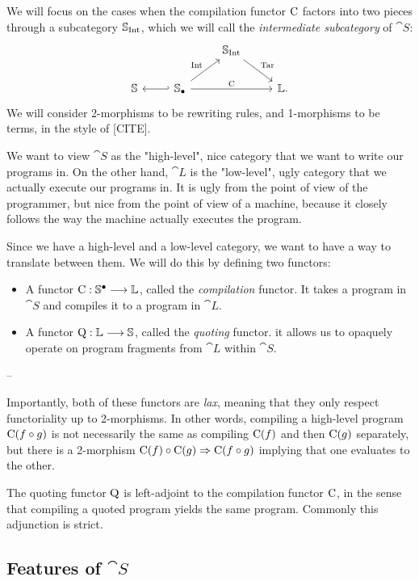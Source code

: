 We will focus on the cases when the compilation functor $\mathrm C$ factors into
two pieces through a subcategory $\mathbb S _{\mathrm{Int}}$, which we will call the
\emph{intermediate subcategory} of $\cat S$: $$
  \begin{tikzcd}
    & & \cat S_{\fun{Int}} \arrow[dr, "\fun{Tar}"] & \\
    \cat S & \arrow[l, hook'] \cat S_{\bullet} \arrow[ur, "\fun{Int}"] \arrow[rr, "\fun{C}"] & & \cat L .
  \end{tikzcd}
$$
We will consider 2-morphisms to be rewriting rules, and 1-morphisms to be
terms, in the style of [CITE].

We want to view $\cat S$ as the "high-level", nice category that we want to
write our programs in. On the other hand, $\cat L$ is the "low-level", ugly
category that we actually execute our programs in. It is ugly from the point of
view of the programmer, but nice from the point of view of a machine, because
it closely follows the way the machine actually executes the program.

Since we have a high-level and a low-level category, we want to have a way to
translate between them. We will do this by defining two functors:
\begin{itemize}
  \item A functor $\mathrm C : \mathbb S^{\bullet} \longrightarrow \mathbb L $, called the
        \emph{compilation} functor. It takes a program in $\cat S$ and compiles it to a
        program in $\cat L$.
  \item A functor $\mathrm Q : \mathbb L \longrightarrow \mathbb S $, called the \emph{quoting}
        functor. it allows us to opaquely operate on program fragments from $\cat L$
        within $\cat S$.
\end{itemize}

--

Importantly, both of these functors are \emph{lax}, meaning that they only
respect functoriality up to 2-morphisms. In other words, compiling a high-level
program $\mathrm C(f \circ g)$ is not necessarily the same as compiling $\mathrm
  C(f)$ and then $\mathrm C(g)$ separately, but there is a 2-morphism $\mathrm C(f)
  \circ \mathrm C(g) \Rightarrow \mathrm C(f \circ g)$ implying that one evaluates to
the other.

The quoting functor $\mathrm Q$ is left-adjoint to the compilation functor $\mathrm
  C$, in the sense that compiling a quoted program yields the same program.
Commonly this adjunction is strict.

\subsection{Features of $\cat S$}

